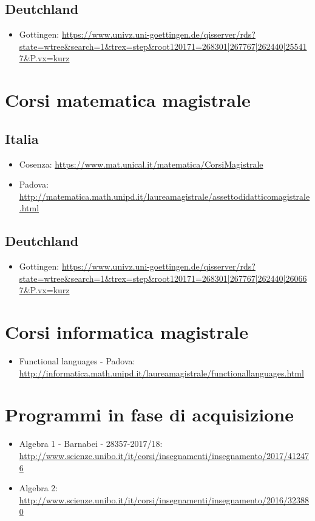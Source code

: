 \subsection{Deutchland}
\begin{itemize}
 \item Gottingen: \url{https://www.univz.uni-goettingen.de/qisserver/rds?state=wtree&search=1&trex=step&root120171=268301|267767|262440|255417&P.vx=kurz}
\end{itemize}


\section*{Corsi matematica magistrale}
\subsection*{Italia}
\begin{itemize}
 \item Cosenza: \url{https://www.mat.unical.it/matematica/CorsiMagistrale}
 \item Padova: \url{http://matematica.math.unipd.it/laureamagistrale/assettodidatticomagistrale.html}
\end{itemize}

\subsection{Deutchland}
\begin{itemize}
 \item Gottingen: \url{https://www.univz.uni-goettingen.de/qisserver/rds?state=wtree&search=1&trex=step&root120171=268301|267767|262440|260667&P.vx=kurz}
\end{itemize}


\section{Corsi informatica magistrale}
\begin{itemize}
 \item Functional languages - Padova: \url{http://informatica.math.unipd.it/laureamagistrale/functionallanguages.html}
\end{itemize}


\section{Programmi in fase di acquisizione}
\begin{itemize}
 \item Algebra 1 - Barnabei - 28357-2017/18: \url{http://www.scienze.unibo.it/it/corsi/insegnamenti/insegnamento/2017/412476}
 \item Algebra 2: \url{http://www.scienze.unibo.it/it/corsi/insegnamenti/insegnamento/2016/323880}
\end{itemize}


